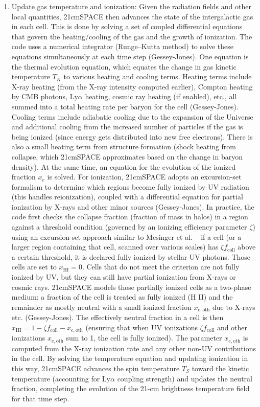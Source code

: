 \documentclass[floats,floatfix,showpacs,amssymb,prd,superscriptaddress,nofootinbib]{revtex4-2} %
\begin{document}
\begin{enumerate}
    \item Update gas temperature and ionization: Given the radiation fields and other local quantities, 21cmSPACE then advances the state of the intergalactic gas in each cell. This is done by solving a set of coupled differential equations that govern the heating/cooling of the gas and the growth of ionization. The code uses a numerical integrator (Runge–Kutta method) to solve these equations simultaneously at each time step (Gessey-Jones). One equation is the thermal evolution equation, which equates the change in gas kinetic temperature $T_K$ to various heating and cooling terms. Heating terms include X-ray heating (from the X-ray intensity computed earlier), Compton heating by CMB photons, Ly$\alpha$ heating, cosmic ray heating (if enabled), etc., all summed into a total heating rate per baryon for the cell (Gessey-Jones). Cooling terms include adiabatic cooling due to the expansion of the Universe and additional cooling from the increased number of particles if the gas is being ionized (since energy gets distributed into new free electrons). There is also a small heating term from structure formation (shock heating from collapse, which 21cmSPACE approximates based on the change in baryon density). At the same time, an equation for the evolution of the ionized fraction $x_e$ is solved. For ionization, 21cmSPACE adopts an excursion-set formalism to determine which regions become fully ionized by UV radiation (this handles reionization), coupled with a differential equation for partial ionization by X-rays and other minor sources (Gessey-Jones). In practice, the code first checks the collapse fraction (fraction of mass in halos) in a region against a threshold condition (governed by an ionizing efficiency parameter $\zeta$) using an excursion-set approach similar to Mesinger et al. – if a cell (or a larger region containing that cell, scanned over various scales) has $\zeta f_{\text{coll}}$ above a certain threshold, it is declared fully ionized by stellar UV photons. Those cells are set to $x_{\mathrm{HI}} = 0$. Cells that do not meet the criterion are not fully ionized by UV, but they can still have partial ionization from X-rays or cosmic rays. 21cmSPACE models those partially ionized cells as a two-phase medium: a fraction of the cell is treated as fully ionized (H II) and the remainder as mostly neutral with a small ionized fraction $x_{e,\text{oth}}$ due to X-rays etc. (Gessey-Jones). The effectively neutral fraction in a cell is then $x_{\mathrm{HI}} = 1 - \zeta f_{\text{coll}} - x_{e,\text{oth}}$ (ensuring that when UV ionizations $\zeta f_{\text{coll}}$ and other ionizations $x_{e,\text{oth}}$ sum to 1, the cell is fully ionized). The parameter $x_{e,\text{oth}}$ is computed from the X-ray ionization rate and any other non-UV contributions in the cell. By solving the temperature equation and updating ionization in this way, 21cmSPACE advances the spin temperature $T_S$ toward the kinetic temperature (accounting for Ly$\alpha$ coupling strength) and updates the neutral fraction, completing the evolution of the 21-cm brightness temperature field for that time step.


\end{enumerate}
\end{document}
